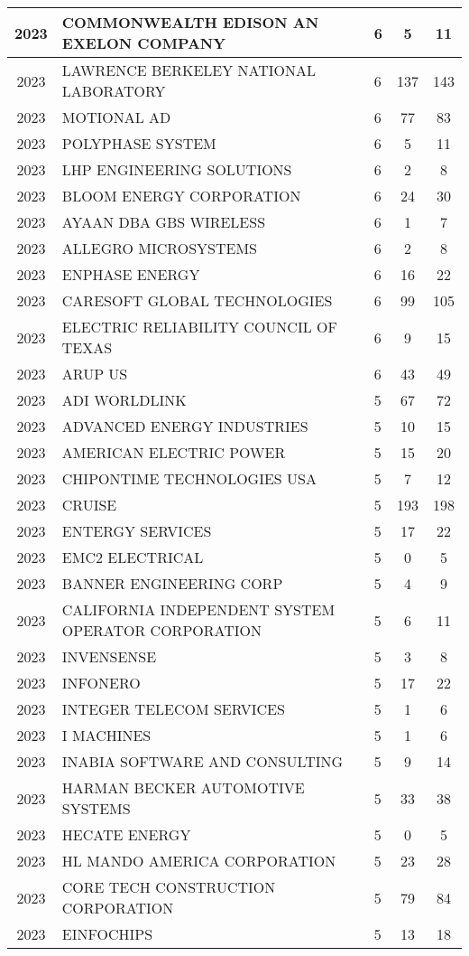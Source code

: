 \documentclass{article}%
\begin{document}
\begin{longtable}{c|p{20em}|p{5em}|c|c}
2023&COMMONWEALTH EDISON AN EXELON COMPANY&6&5&11\\%
\hline%
2023&LAWRENCE BERKELEY NATIONAL LABORATORY&6&137&143\\%
\hline%
2023&MOTIONAL AD&6&77&83\\%
\hline%
2023&POLYPHASE SYSTEM&6&5&11\\%
\hline%
2023&LHP ENGINEERING SOLUTIONS&6&2&8\\%
\hline%
2023&BLOOM ENERGY CORPORATION&6&24&30\\%
\hline%
2023&AYAAN  DBA GBS WIRELESS&6&1&7\\%
\hline%
2023&ALLEGRO MICROSYSTEMS&6&2&8\\%
\hline%
2023&ENPHASE ENERGY&6&16&22\\%
\hline%
2023&CARESOFT GLOBAL TECHNOLOGIES&6&99&105\\%
\hline%
2023&ELECTRIC RELIABILITY COUNCIL OF TEXAS&6&9&15\\%
\hline%
2023&ARUP US&6&43&49\\%
\hline%
2023&ADI WORLDLINK&5&67&72\\%
\hline%
2023&ADVANCED ENERGY INDUSTRIES&5&10&15\\%
\hline%
2023&AMERICAN ELECTRIC POWER&5&15&20\\%
\hline%
2023&CHIPONTIME TECHNOLOGIES USA&5&7&12\\%
\hline%
2023&CRUISE&5&193&198\\%
\hline%
2023&ENTERGY SERVICES&5&17&22\\%
\hline%
2023&EMC2 ELECTRICAL&5&0&5\\%
\hline%
2023&BANNER ENGINEERING CORP&5&4&9\\%
\hline%
2023&CALIFORNIA INDEPENDENT SYSTEM OPERATOR CORPORATION&5&6&11\\%
\hline%
2023&INVENSENSE&5&3&8\\%
\hline%
2023&INFONERO&5&17&22\\%
\hline%
2023&INTEGER TELECOM SERVICES&5&1&6\\%
\hline%
2023&I MACHINES&5&1&6\\%
\hline%
2023&INABIA SOFTWARE AND CONSULTING&5&9&14\\%
\hline%
2023&HARMAN BECKER AUTOMOTIVE SYSTEMS&5&33&38\\%
\hline%
2023&HECATE ENERGY&5&0&5\\%
\hline%
2023&HL MANDO AMERICA CORPORATION&5&23&28\\%
\hline%
2023&CORE TECH CONSTRUCTION CORPORATION&5&79&84\\%
\hline%
2023&EINFOCHIPS&5&13&18\\%

\end{longtable}
\end{document}
